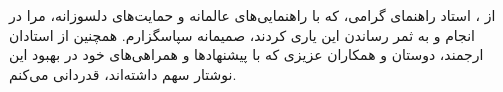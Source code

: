 

\begin{center}
\end{center}

از \ThesisSupervisor{}، استاد راهنمای گرامی، که با راهنمایی‌های عالمانه و حمایت‌های دلسوزانه،
مرا در انجام و به ثمر رساندن این \ThesisType{} یاری کردند، صمیمانه سپاسگزارم.
همچنین از استادان ارجمند، دوستان و همکاران عزیزی که با پیشنهادها و همراهی‌های خود
در بهبود این نوشتار سهم داشته‌اند، قدردانی می‌کنم.


